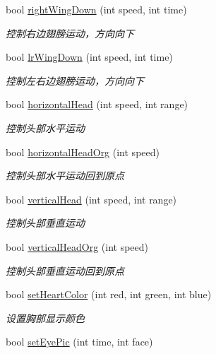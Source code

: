 \begin{DoxyCompactItemize}
bool \hyperlink{classQRobotController_a3dbffb4285c5997671252f667f53b4c9}{right\-Wing\-Down} (int speed, int time)
\begin{DoxyCompactList}\small\item\em 控制右边翅膀运动，方向向下 \end{DoxyCompactList}\item 
bool \hyperlink{classQRobotController_ad5e7a8fa2198414ac062d595df67586c}{lr\-Wing\-Down} (int speed, int time)
\begin{DoxyCompactList}\small\item\em 控制左右边翅膀运动，方向向下 \end{DoxyCompactList}\item 
bool \hyperlink{classQRobotController_a09e6972e4f9c8869b808e8ca6a20b977}{horizontal\-Head} (int speed, int range)
\begin{DoxyCompactList}\small\item\em 控制头部水平运动 \end{DoxyCompactList}\item 
bool \hyperlink{classQRobotController_a9b9522a4e86a388b37971126ea618623}{horizontal\-Head\-Org} (int speed)
\begin{DoxyCompactList}\small\item\em 控制头部水平运动回到原点 \end{DoxyCompactList}\item 
bool \hyperlink{classQRobotController_acc6ddd9cc70deeda6691b81cf0c23078}{vertical\-Head} (int speed, int range)
\begin{DoxyCompactList}\small\item\em 控制头部垂直运动 \end{DoxyCompactList}\item 
bool \hyperlink{classQRobotController_a8f3098e2e75d7fdec7dec06f23171859}{vertical\-Head\-Org} (int speed)
\begin{DoxyCompactList}\small\item\em 控制头部垂直运动回到原点 \end{DoxyCompactList}\item 
bool \hyperlink{classQRobotController_a4ecc1e113f493138fcf54a374f9634cf}{set\-Heart\-Color} (int red, int green, int blue)
\begin{DoxyCompactList}\small\item\em 设置胸部显示颜色 \end{DoxyCompactList}\item 
bool \hyperlink{classQRobotController_aba1f6f7efc851b97634004f2a8ec634b}{set\-Eye\-Pic} (int time, int face)

\end{DoxyCompactItemize}
